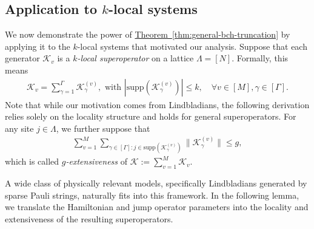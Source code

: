 \documentclass[11pt]{article}
\newcommand{\thm}[1]{\hyperref[thm:#1]{Theorem~\ref*{thm:#1}}}
\newcommand{\supp}{\mathrm{supp}}
\newcommand{\mc}{\mathcal}
\begin{document}
\subsection{Application to $k$-local systems}
\label{sec:k-local-example}

We now demonstrate the power of \thm{general-bch-truncation} by applying it to the $k$-local systems that motivated our analysis. Suppose that each generator $\mc K_v$ is a \emph{$k$-local superoperator} on a lattice $\Lambda = [N]$. Formally, this means
\begin{align*}
    \mc K_v = \sum_{\gamma = 1}^{\Gamma} \mc K_{\gamma}^{(v)}, \text{ with } |\supp(\mc K_{\gamma}^{(v)} )|\le k, \quad \forall v\in [M], \gamma\in [\Gamma].
\end{align*} 
Note that while our motivation comes from Lindbladians, the following derivation relies solely on the locality structure and holds for general superoperators.
For any site $j\in \Lambda$, we further suppose that 
\begin{align*}
    \sum_{v=1}^M\sum_{\gamma\in [\Gamma]: j\in \supp(\mc K_{\gamma}^{(v)})}\|\mc K_\gamma^{(v)}\|\le g,
\end{align*}
which is called \emph{$g$-extensiveness} of $\mc K:= \sum_{v=1}^M \mc K_v$.

A wide class of physically relevant models, specifically Lindbladians generated by sparse Pauli strings, naturally fits into this framework. In the following lemma, we translate the Hamiltonian and jump operator parameters into the locality and extensiveness of the resulting superoperators.
\end{document}
